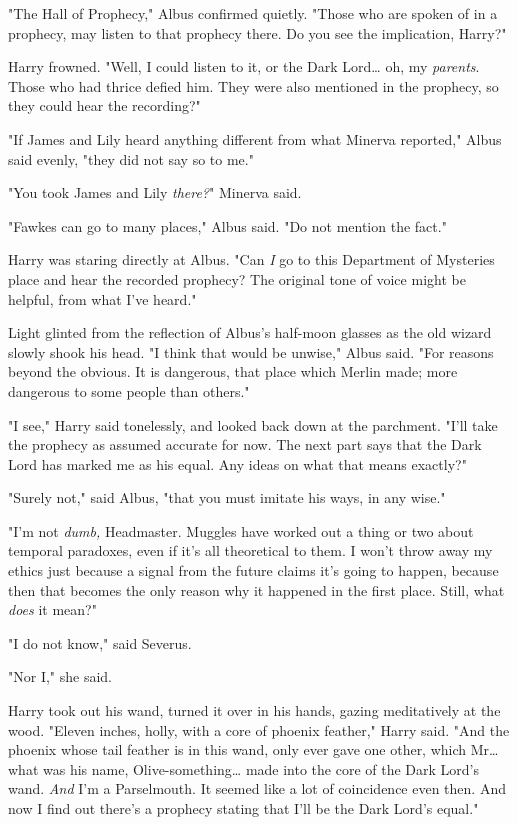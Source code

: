 "The Hall of Prophecy," Albus confirmed quietly. "Those who are spoken of in a
prophecy, may listen to that prophecy there. Do you see the implication, Harry?"

Harry frowned. "Well, I could listen to it, or the Dark Lord{\ldots} oh, my
\emph{parents}. Those who had thrice defied him. They were also mentioned in
the prophecy, so they could hear the recording?"

"If James and Lily heard anything different from what Minerva reported," Albus
said evenly, "they did not say so to me."

"You took James and Lily \emph{there?}" Minerva said.

"Fawkes can go to many places," Albus said. "Do not mention the fact."

Harry was staring directly at Albus. "Can \emph{I} go to this Department of
Mysteries place and hear the recorded prophecy? The original tone of voice
might be helpful, from what I've heard."

Light glinted from the reflection of Albus's half-moon glasses as the old
wizard slowly shook his head. "I think that would be unwise," Albus said. "For
reasons beyond the obvious. It is dangerous, that place which Merlin made; more
dangerous to some people than others."

"I see," Harry said tonelessly, and looked back down at the parchment. "I'll
take the prophecy as assumed accurate for now. The next part says that the Dark
Lord has marked me as his equal. Any ideas on what that means exactly?"

"Surely not," said Albus, "that you must imitate his ways, in any wise."

"I'm not \emph{dumb,} Headmaster. Muggles have worked out a thing or two about
temporal paradoxes, even if it's all theoretical to them. I won't throw away my
ethics just because a signal from the future claims it's going to happen,
because then that becomes the only reason why it happened in the first place.
Still, what \emph{does} it mean?"

"I do not know," said Severus.

"Nor I," she said.

Harry took out his wand, turned it over in his hands, gazing meditatively at
the wood. "Eleven inches, holly, with a core of phoenix feather," Harry said.
"And the phoenix whose tail feather is in this wand, only ever gave one other,
which Mr{\ldots} what was his name, Olive-something{\ldots} made into the core
of the Dark Lord's wand. \emph{And} I'm a Parselmouth. It seemed like a lot of
coincidence even then. And now I find out there's a prophecy stating that I'll
be the Dark Lord's equal."

